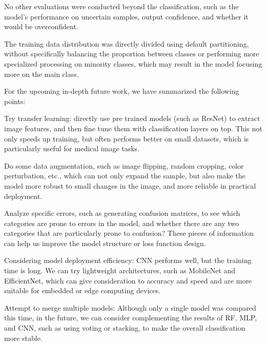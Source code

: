 \noindent 

No other evaluations were conducted beyond the classification, such as the model's performance on uncertain samples, output confidence, and whether it would be overconfident.

\noindent 

The training data distribution was directly divided using default partitioning, without specifically balancing the proportion between classes or performing more specialized processing on minority classes, which may result in the model focusing more on the main class.

\noindent 

For the upcoming in-depth future work, we have summarized the following points:

\noindent 

Try transfer learning: directly use pre trained models (such as ResNet) to extract image features, and then fine tune them with classification layers on top. This not only speeds up training, but often performs better on small datasets, which is particularly useful for medical image tasks.

\noindent 

Do some data augmentation, such as image flipping, random cropping, color perturbation, etc., which can not only expand the sample, but also make the model more robust to small changes in the image, and more reliable in practical deployment.

\noindent 

Analyze specific errors, such as generating confusion matrices, to see which categories are prone to errors in the model, and whether there are any two categories that are particularly prone to confusion? These pieces of information can help us improve the model structure or loss function design.

\noindent 

Considering model deployment efficiency: CNN performs well, but the training time is long. We can try lightweight architectures, such as MobileNet and EfficientNet, which can give consideration to accuracy and speed and are more suitable for embedded or edge computing devices.

\noindent 

Attempt to merge multiple models: Although only a single model was compared this time, in the future, we can consider complementing the results of RF, MLP, and CNN, such as using voting or stacking, to make the overall classification more stable.